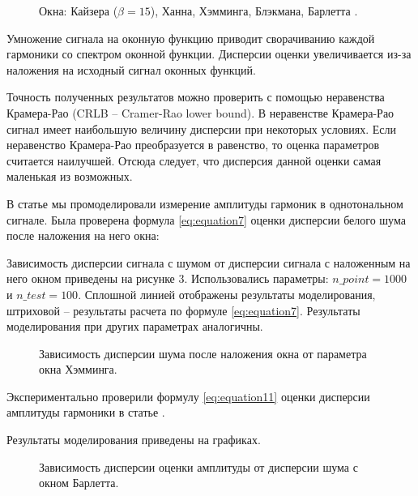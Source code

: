 \begin{figure}[ht]
	\caption{Окна: Кайзера ($\beta=15$), Ханна, Хэмминга, Блэкмана, Барлетта .}\label{img:Windows}
\end{figure}
Умножение сигнала на оконную функцию приводит сворачиванию каждой гармоники со спектром оконной функции. Дисперсии оценки увеличивается из-за наложения на исходный сигнал оконных функций. 

Точность полученных результатов можно проверить с помощью неравенства Крамера-Рао (CRLB -- Cramer-Rao lower bound). В неравенстве Крамера-Рао сигнал имеет наибольшую величину дисперсии при некоторых условиях. Если неравенство Крамера-Рао преобразуется в равенство, то оценка параметров считается наилучшей. Отсюда следует, что дисперсия данной оценки самая маленькая из возможных.

В статье \cite{altman2020boundary} мы промоделировали измерение амплитуды гармоник в однотональном сигнале. Была проверена формула \ref{eq:equation7} оценки дисперсии белого шума после наложения на него окна:

Зависимость дисперсии сигнала с шумом от дисперсии сигнала с наложенным на него окном приведены на рисунке 3. Использовались параметры: $n\_point = 1000$ и $n\_test = 100$. Сплошной линией отображены результаты моделирования, штриховой -- результаты расчета по формуле \ref{eq:equation7}. Результаты моделирования при других параметрах аналогичны.


\begin{figure}[ht]
	\caption{Зависимость дисперсии шума после наложения окна от параметра окна Хэмминга.}\label{img:noise_win_var_hamming}
\end{figure}

Экспериментально проверили формулу \ref{eq:equation11} оценки дисперсии амплитуды гармоники в статье \cite{altman2020boundary}.

Результаты моделирования приведены на графиках. 
\begin{figure}[ht]
	\caption{Зависимость дисперсии оценки амплитуды от дисперсии шума с окном Барлетта.}\label{img:windows_barlett}
\end{figure}

